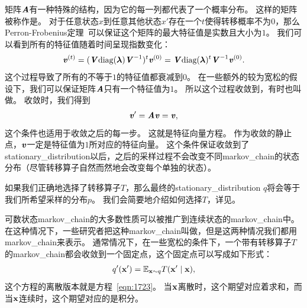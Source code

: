 矩阵$\boldsymbol{\mathit{A}}$有一种特殊的结构，因为它的每一列都代表了一个概率分布。
这样的矩阵被称作是。
对于任意状态$x$到任意其他状态$x'$存在一个$t$使得转移概率不为$0$，那么Perron-Frobenius定理~\citep{perron1907theorie,frobenius1908matrizen}可以保证这个矩阵的最大特征值是实数且大小为$1$。
我们可以看到所有的特征值随着时间呈现指数变化：
\begin{align}
\boldsymbol{\mathit{v}}^{(t)} = (\boldsymbol{\mathit{V}} \text{diag}(\boldsymbol{\lambda})\boldsymbol{\mathit{V}}^{-1})^{t} \boldsymbol{\mathit{v}}^{(0)} = \boldsymbol{\mathit{V}} \text{diag}(\boldsymbol{\lambda})^t \boldsymbol{\mathit{V}}^{-1} \boldsymbol{\mathit{v}}^{(0)}.
\end{align}
这个过程导致了所有的不等于$1$的特征值都衰减到$0$。
在一些额外的较为宽松的假设下，我们可以保证矩阵$\boldsymbol{\mathit{A}}$只有一个特征值为$1$。
所以这个过程收敛到，有时也叫做。
收敛时，我们得到
\begin{align}
\label{eqn:1723}
\boldsymbol{\mathit{v}} ' = \boldsymbol{\mathit{A}} \boldsymbol{\mathit{v}} = \boldsymbol{\mathit{v}},
\end{align}
这个条件也适用于收敛之后的每一步。
这就是特征向量方程。
作为收敛的静止点，$\boldsymbol{\mathit{v}}$一定是特征值为$1$所对应的特征向量。
这个条件保证收敛到了\gls{stationary_distribution}以后，之后的采样过程不会改变不同\gls{markov_chain}的状态分布（尽管转移算子自然而然地会改变每个单独的状态）。

如果我们正确地选择了转移算子$T$，那么最终的\gls{stationary_distribution} $q$将会等于我们所希望采样的分布$p$。
我们会简要地介绍如何选择$T$，详见。


可数状态\gls{markov_chain}的大多数性质可以被推广到连续状态的\gls{markov_chain}中。
在这种情况下，一些研究者把这种\gls{markov_chain}叫做，但是这两种情况我们都用\gls{markov_chain}来表示。
通常情况下，在一些宽松的条件下，一个带有转移算子$T$的\gls{markov_chain}都会收敛到一个固定点，这个固定点可以写成如下形式：
\begin{align}
q' (\mathbf{x}') = \mathbb{E}_{\mathbf{x}\sim q}T(\mathbf{x}'\mid \mathbf{x}),
\end{align}
这个方程的离散版本就是方程~\eqref{eqn:1723}。	
当$\mathbf{x}$离散时，这个期望对应着求和，而当$\mathbf{x}$连续时，这个期望对应的是积分。



